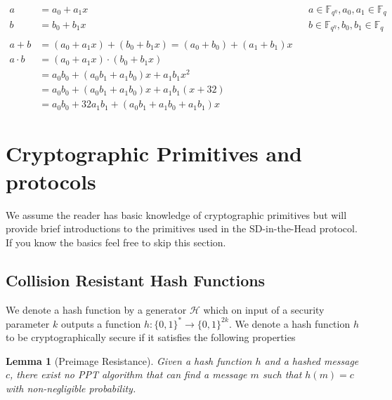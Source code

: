 \documentclass[twoside,11pt]{report}
\theoremstyle{definition}
\theoremstyle{plain}
\newtheorem{lemma}{Lemma}[section]
\begin{document}
\begin{align*}
  a         & = a_0 + a_1x                                               &  & a \in \mathbb{F}_{q^\eta}, a_0, a_1 \in \mathbb{F}_q \\
  b         & = b_0 + b_1x                                               &  & b \in \mathbb{F}_{q^\eta}, b_0, b_1 \in \mathbb{F}_q \\\\
  a + b     & = (a_0 + a_1x) + (b_0 + b_1x) = (a_0 + b_0) + (a_1 + b_1)x                                                           \\
  a \cdot b & = (a_0 + a_1x) \cdot (b_0 + b_1x)                                                                                    \\
            & = a_0b_0 + (a_0b_1 + a_1b_0)x + a_1b_1x^2                                                                            \\
            & = a_0b_0 + (a_0b_1 + a_1b_0)x + a_1b_1(x + 32)                                                                       \\
            & = a_0b_0 + 32a_1b_1 + (a_0b_1 + a_1b_0 + a_1b_1)x
\end{align*}

\section{Cryptographic Primitives and protocols}
We assume the reader has basic knowledge of cryptographic primitives but will provide brief introductions to the primitives used in the SD-in-the-Head protocol. If you know the basics feel free to skip this section.

\subsection{Collision Resistant Hash Functions}\label{sec:prelim_hash}
We denote a hash function by a generator $\mathcal{H}$ which on input of a security parameter $k$ outputs a function $h : \{0,1{\}}^* \rightarrow \{0,1{\}}^{2k}$. We denote a hash function $h$ to be cryptographically secure if it satisfies the following properties

\begin{lemma}[Preimage Resistance]\label{lem:preimage}
  Given a hash function $h$ and a hashed message $c$, there exist no PPT algorithm that can find a message $m$ such that $h(m) = c$ with non-negligible probability.
\end{lemma}
\end{document}
